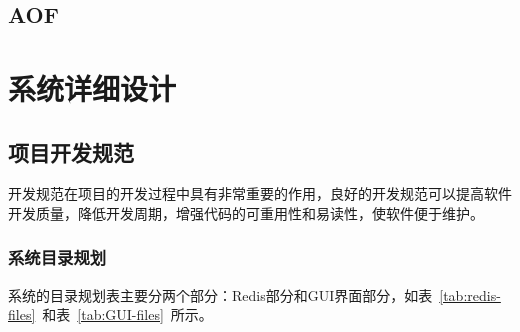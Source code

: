 \documentclass{zjutthesis}
\begin{document}
\section{AOF}















\chapter{系统详细设计}
\section{项目开发规范}
开发规范在项目的开发过程中具有非常重要的作用，良好的开发规范可以提高软件开发质量，降低开发周期，增强代码的可重用性和易读性，使软件便于维护。

\subsection{系统目录规划}
系统的目录规划表主要分两个部分：Redis部分和GUI界面部分，如表~\ref{tab:redis-files}~和表~\ref{tab:GUI-files}~所示。

\begin{table}[H]
\centering
\caption{系统目录规划表（Redis部分）}\label{tab:redis-files}
\vspace{\baselineskip}
\end{table}

\begin{table}[H]
\centering
\caption{系统目录规划表（GUI部分）}\label{tab:GUI-files}
\vspace{\baselineskip}
\end{table}
\end{document}
